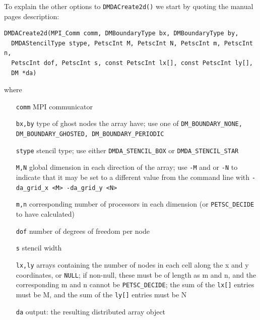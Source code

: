 To explain the other options to \texttt{DMDACreate2d()} we start by quoting the \PETSc manual pages description:

\noindent\hrulefill
\begin{Verbatim}[fontsize=\small]
DMDACreate2d(MPI_Comm comm, DMBoundaryType bx, DMBoundaryType by,
  DMDAStencilType stype, PetscInt M, PetscInt N, PetscInt m, PetscInt n,
  PetscInt dof, PetscInt s, const PetscInt lx[], const PetscInt ly[],
  DM *da)
\end{Verbatim}
where
\small
\begin{itemize}[align=left]
\item[\texttt{comm}]   MPI communicator \\
\item[\texttt{bx,by}]  type of ghost nodes the array have; use one of \texttt{DM\_BOUNDARY\_NONE, DM\_BOUNDARY\_GHOSTED, DM\_BOUNDARY\_PERIODIC} \\
\item[\texttt{stype}] stencil type; use either \texttt{DMDA\_STENCIL\_BOX} or \texttt{DMDA\_STENCIL\_STAR} \\
\item[\texttt{M,N}]	   global dimension in each direction of the array; use \texttt{-M} and or \texttt{-N} to indicate that it may be set to a different value from the command line with \texttt{-da\_grid\_x <M> -da\_grid\_y <N>} \\
\item[\texttt{m,n}]   corresponding number of processors in each dimension (or \texttt{PETSC\_DECIDE} to have calculated) \\
\item[\texttt{dof}]     number of degrees of freedom per node \\
\item[\texttt{s}]       stencil width \\
\item[\texttt{lx,ly}]  arrays containing the number of nodes in each cell along the x and y coordinates, or \texttt{NULL}; if non-null, these must be of length as m and n, and the corresponding m and n cannot be \texttt{PETSC\_DECIDE}; the sum of the \texttt{lx[]} entries must be M, and the sum of the \texttt{ly[]} entries must be N \\
\item[\texttt{da}]      output: the resulting distributed array object 
\end{itemize}
\normalsize
\noindent\hrulefill
\medskip

